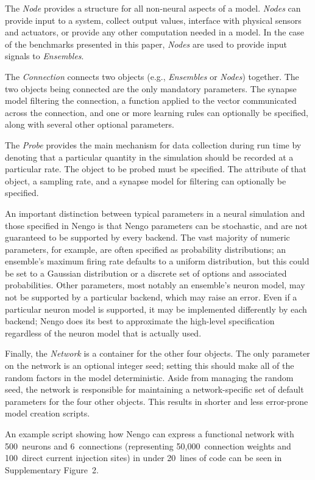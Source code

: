 \documentclass{frontiersSCNS}
\begin{document}
The \textit{Node} provides a structure for all
non-neural aspects of a model.
\textit{Nodes} can provide input to a system,
collect output values,
interface with physical sensors and actuators,
or provide any other computation needed in a model.
In the case of the benchmarks presented in this paper,
\textit{Nodes} are used to provide input signals
to \textit{Ensembles}.

The \textit{Connection} connects two objects
(e.g., \textit{Ensembles} or \textit{Nodes}) together.
The two objects being connected are the only mandatory parameters.
The synapse model filtering the connection,
a function applied to the vector
communicated across the connection,
and one or more learning rules
can optionally be specified,
along with several other optional parameters.

The \textit{Probe} provides the main mechanism
for data collection during run time
by denoting that a particular
quantity in the simulation should be recorded
at a particular rate.
The object to be probed must be specified.
The attribute of that object,
a sampling rate, and a synapse model for filtering
can optionally be specified.

An important distinction between typical
parameters in a neural simulation
and those specified in Nengo
is that Nengo parameters can be stochastic,
and are not guaranteed
to be supported by every backend.
The vast majority of numeric parameters,
for example,
are often specified as probability distributions;
an ensemble's maximum firing rate defaults to
a uniform distribution,
but this could be set to a Gaussian distribution
or a discrete set of options and associated
probabilities.
Other parameters,
most notably an ensemble's neuron model,
may not be supported by a particular backend,
which may raise an error.
Even if a particular neuron model is supported,
it may be implemented differently by each backend;
Nengo does its best to approximate
the high-level specification regardless of
the neuron model that is actually used.

Finally, the \textit{Network} is a
container for the other four objects.
The only parameter on the network
is an optional integer seed;
setting this should make
all of the random factors
in the model deterministic.
Aside from managing the random seed,
the network is responsible for maintaining
a network-specific set of default parameters
for the four other objects.
This results in shorter and less error-prone
model creation scripts.

An example script showing how Nengo can
express a functional network
with 500~neurons and 6~connections
(representing 50,000~connection weights
and 100~direct current injection sites)
in under 20~lines of code
can be seen in Supplementary Figure~2.
\end{document}
